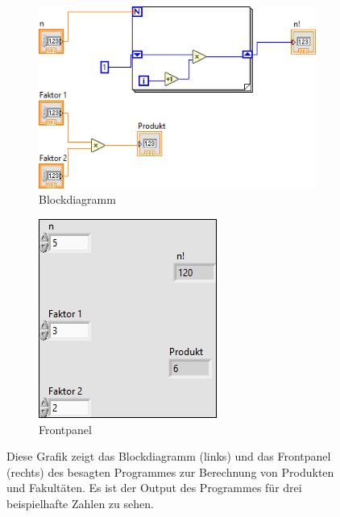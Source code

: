 \begin{figure}[ht]
	\centering
	\begin{subfigure}[c]{0.55\textwidth}
		\centering
		\includegraphics[width=\textwidth]{pic/fup1.png}
		\caption{Blockdiagramm}
	\end{subfigure}
	\begin{subfigure}[c]{0.35\textwidth}
		\centering
		\includegraphics[width=\textwidth]{pic/fup2.png}
		\caption{Frontpanel}
	\end{subfigure}
	\caption{Diese Grafik zeigt das Blockdiagramm (links) und das Frontpanel (rechts) des besagten Programmes zur Berechnung von Produkten und Fakultäten. Es ist der Output des Programmes für drei beispielhafte Zahlen zu sehen.}
	\label{fig:fup}	
\end{figure}

